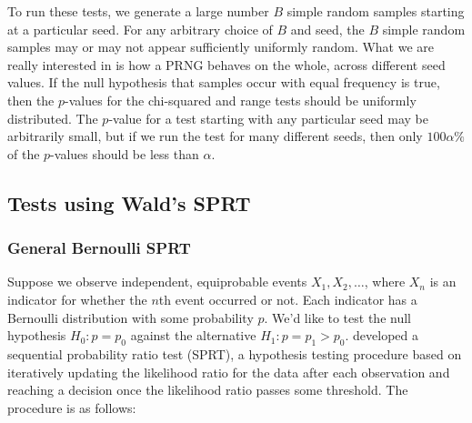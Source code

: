 \documentclass[12pt]{article}
\begin{document}
To run these tests, we generate a large number $B$ simple random samples starting at a particular seed. 
For any arbitrary choice of $B$ and seed, the $B$ simple random samples may or may not appear sufficiently uniformly random. 
What we are really interested in is how a PRNG behaves on the whole, across different seed values.
If the null hypothesis that samples occur with equal frequency is true, then the $p$-values for the chi-squared and range tests should be uniformly distributed. 
The $p$-value for a test starting with any particular seed may be arbitrarily small, but if we run the test for many different seeds, then only $100 \alpha \%$ of the $p$-values should be less than $\alpha$.
%


\subsection{Tests using Wald's SPRT}
\subsubsection{General Bernoulli SPRT}

Suppose we observe independent, equiprobable events $X_1, X_2, \dots$, where $X_n$ is an indicator for whether the $n$th event occurred or not. 
Each indicator has a Bernoulli distribution with some probability $p$. 
We'd like to test the null hypothesis $H_0: p = p_0$ against the alternative $H_1: p = p_1 > p_0$. 
\citet{wald_sequential_1947} developed a sequential probability ratio test (SPRT), a hypothesis testing procedure based on iteratively updating the likelihood ratio for the data after each observation and reaching a decision once the likelihood ratio passes some threshold.
The procedure is as follows:
\end{document}
